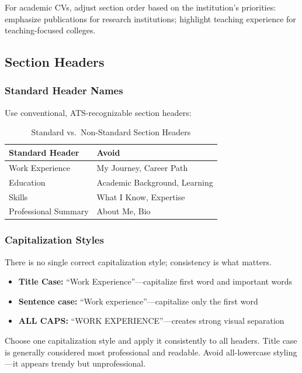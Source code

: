 \documentclass[11pt,a4paper]{article}
\begin{document}
\begin{designtip}
For academic CVs, adjust section order based on the institution's priorities: emphasize publications for research institutions; highlight teaching experience for teaching-focused colleges.
\end{designtip}

\subsection{Section Headers}

\subsubsection{Standard Header Names}

Use conventional, ATS-recognizable section headers:

\begin{table}[h]
\centering
\begin{tabular}{@{}ll@{}}
\toprule
\textbf{Standard Header} & \textbf{Avoid} \\
\midrule
Work Experience & My Journey, Career Path \\
Education & Academic Background, Learning \\
Skills & What I Know, Expertise \\
Professional Summary & About Me, Bio \\
\bottomrule
\end{tabular}
\caption{Standard vs.\ Non-Standard Section Headers}
\end{table}

\subsubsection{Capitalization Styles}

There is no single correct capitalization style; consistency is what matters.

\begin{itemize}
    \item \textbf{Title Case:} ``Work Experience''---capitalize first word and important words
    \item \textbf{Sentence case:} ``Work experience''---capitalize only the first word
    \item \textbf{ALL CAPS:} ``WORK EXPERIENCE''---creates strong visual separation
\end{itemize}

\begin{bestpractice}
Choose one capitalization style and apply it consistently to all headers. Title case is generally considered most professional and readable. Avoid all-lowercase styling---it appears trendy but unprofessional.
\end{bestpractice}
\end{document}

